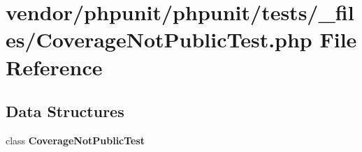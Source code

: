 \section{vendor/phpunit/phpunit/tests/\+\_\+files/\+Coverage\+Not\+Public\+Test.php File Reference}
\label{phpunit_2tests_2__files_2_coverage_not_public_test_8php}
\subsection*{Data Structures}
\begin{DoxyCompactItemize}
\item 
class {\bf Coverage\+Not\+Public\+Test}
\end{DoxyCompactItemize}
